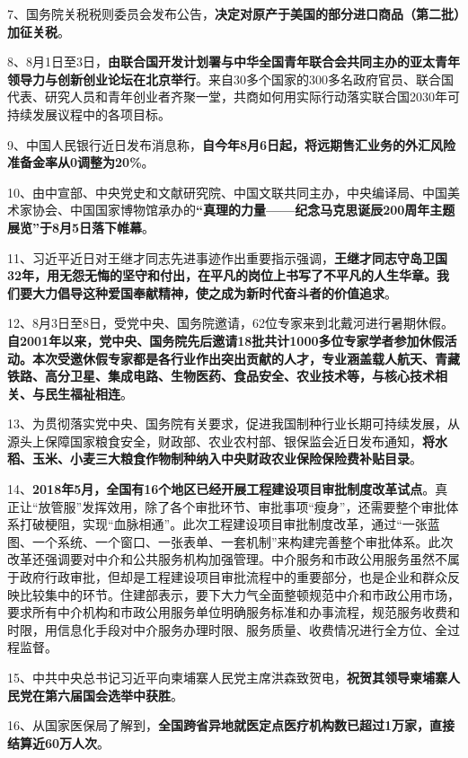 7、国务院关税税则委员会发布公告，\textbf{{决定对原产于美国的部分进口商品（第二批）加征关税}}。

8、8月1日至3日，{\textbf{由联合国开发计划署与中华全国青年联合会共同主办的亚太青年领导力与创新创业论坛在北京举行}}。来自30多个国家的300多名政府官员、联合国代表、研究人员和青年创业者齐聚一堂，共商如何用实际行动落实联合国2030年可持续发展议程中的各项目标。

9、中国人民银行近日发布消息称，{\textbf{自今年8月6日起，将远期售汇业务的外汇风险准备金率从0调整为20\%}}。

10、由中宣部、中央党史和文献研究院、中国文联共同主办，中央编译局、中国美术家协会、中国国家博物馆承办的{\textbf{``真理的力量------纪念马克思诞辰200周年主题展览''于8月5日落下帷幕}}。

11、习近平近日对王继才同志先进事迹作出重要指示强调，{\textbf{王继才同志守岛卫国32年，用无怨无悔的坚守和付出，在平凡的岗位上书写了不平凡的人生华章。我们要大力倡导这种爱国奉献精神，使之成为新时代奋斗者的价值追求}}。

12、8月3日至8日，受党中央、国务院邀请，62位专家来到北戴河进行暑期休假。{\textbf{自2001年以来，党中央、国务院先后邀请18批共计1000多位专家学者参加休假活动。本次受邀休假专家都是各行业作出突出贡献的人才，专业涵盖载人航天、青藏铁路、高分卫星、集成电路、生物医药、食品安全、农业技术等，与核心技术相关、与民生福祉相连}}。

13、为贯彻落实党中央、国务院有关要求，促进我国制种行业长期可持续发展，从源头上保障国家粮食安全，财政部、农业农村部、银保监会近日发布通知，{\textbf{将水稻、玉米、小麦三大粮食作物制种纳入中央财政农业保险保险费补贴目录}}。

14、{\textbf{2018年5月，全国有16个地区已经开展工程建设项目审批制度改革试点}}。真正让``放管服''发挥效用，除了各个审批环节、审批事项``瘦身''，还需要整个审批体系打破梗阻，实现``血脉相通''。此次工程建设项目审批制度改革，通过``一张蓝图、一个系统、一个窗口、一张表单、一套机制''来构建完善整个审批体系。此次改革还强调要对中介和公共服务机构加强管理。中介服务和市政公用服务虽然不属于政府行政审批，但却是工程建设项目审批流程中的重要部分，也是企业和群众反映比较集中的环节。住建部表示，要下大力气全面整顿规范中介和市政公用市场，要求所有中介机构和市政公用服务单位明确服务标准和办事流程，规范服务收费和时限，用信息化手段对中介服务办理时限、服务质量、收费情况进行全方位、全过程监督。

15、中共中央总书记习近平向柬埔寨人民党主席洪森致贺电，{\textbf{祝贺其领导柬埔寨人民党在第六届国会选举中获胜}}。

16、从国家医保局了解到，{\textbf{全国跨省异地就医定点医疗机构数已超过1万家，直接结算近60万人次}}。

